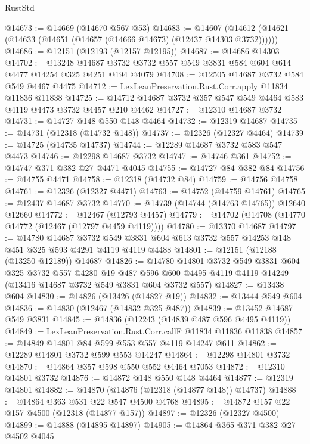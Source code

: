 \begin{lexlean}{RustStd}
\begin{coremodule}
@14673 := @14669 (@14670 @567 @53)
@14683 := @14607 (@14612 (@14621 (@14633 (@14651 (@14657 (@14666 @14673) (@12437 @14303 @3732))))))
@14686 := @12151 (@12193 (@12157 @12195))
@14687 := @14686 @14303
@14702 := @13248
    @14687
    @3732
    @3732
    @557
    @549
    @3831
    @584
    @604
    @614
    @4477
    @14254
    @325
    @4251
    @194
    @4079
@14708 := @12505 @14687 @3732 @584 @549 @4467 @4475
@14712 := LexLeanPreservation.Rust.Corr.apply @11834 @11836 @11838
@14725 := @14712 @14687 @3732 @357 @547 @549 @4464 @583 @4119 @4473 @3732 @4457 @210 @4462
@14727 := @12310 @14687 @3732
@14731 := @14727 @148 @550 @148 @4464
@14732 := @12319 @14687
@14735 := @14731 (@12318 (@14732 @148))
@14737 := @12326 (@12327 @4464)
@14739 := @14725 (@14735 @14737)
@14744 := @12289 @14687 @3732 @583 @547 @4473
@14746 := @12298 @14687 @3732
@14747 := @14746 @361
@14752 := @14747 @371 @382 @27 @4471 @4045
@14755 := @14727 @84 @382 @84
@14756 := @14755 @4471
@14758 := @12318 (@14732 @84)
@14759 := @14756 @14758
@14761 := @12326 (@12327 @4471)
@14763 := @14752 (@14759 @14761)
@14765 := @12437 @14687 @3732
@14770 := @14739 (@14744 (@14763 @14765)) @12640 @12660
@14772 := @12467 (@12793 @4457)
@14779 := @14702 (@14708 (@14770 @14772 (@12467 (@12797 @4459 @4119))))
@14780 := @13370 @14687
@14797 := @14780
    @14687
    @3732
    @549
    @3831
    @604
    @613
    @3732
    @557
    @14253
    @148
    @451
    @325
    @593
    @4291
    @4119
    @4119
    @4488
@14801 := @12151 (@12188 (@13250 @12189)) @14687
@14826 := @14780
    @14801
    @3732
    @549
    @3831
    @604
    @325
    @3732
    @557
    @4280
    @19
    @487
    @596
    @600
    @4495
    @4119
    @4119
    @14249
    (@13416 @14687 @3732 @549 @3831 @604 @3732 @557)
@14827 := @13438 @604
@14830 := @14826 (@13426 (@14827 @19))
@14832 := @13444 @549 @604
@14836 := @14830 (@12467 (@14832 @325 @487))
@14839 := @13452 @14687 @549 @3831
@14845 := @14836 (@12243 (@14839 @487 @596 @4495 @4119))
@14849 := LexLeanPreservation.Rust.Corr.callF @11834 @11836 @11838
@14857 := @14849 @14801 @84 @599 @553 @557 @4119 @14247 @611
@14862 := @12289 @14801 @3732 @599 @553 @14247
@14864 := @12298 @14801 @3732
@14870 := @14864 @357 @598 @550 @552 @4464 @7053
@14872 := @12310 @14801 @3732
@14876 := @14872 @148 @550 @148 @4464
@14877 := @12319 @14801
@14882 := @14870 (@14876 (@12318 (@14877 @148)) @14737)
@14888 := @14864 @363 @531 @22 @547 @4500 @4768
@14895 := @14872 @157 @22 @157 @4500 (@12318 (@14877 @157))
@14897 := @12326 (@12327 @4500)
@14899 := @14888 (@14895 @14897)
@14905 := @14864 @365 @371 @382 @27 @4502 @4045

\end{coremodule}
\end{lexlean}
